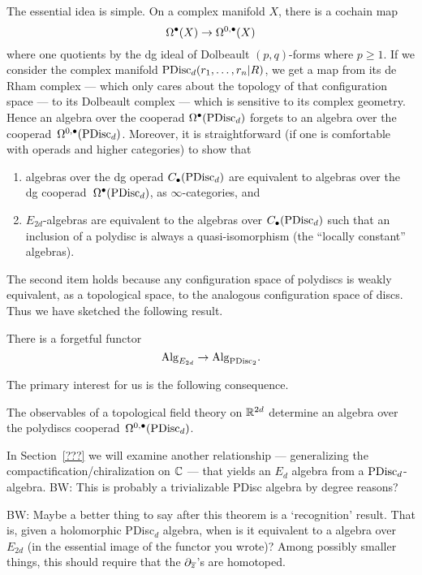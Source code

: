 \documentclass[11pt]{amsart}
\def\del{\partial}
\def\brian#1{{\textcolor{blue!75!red}{BW: {#1}}}}
\begin{document}
The essential idea is simple.
On a complex manifold $X$, there is a cochain map
\[
\Omega^\bullet(X) \to \Omega^{0,\bullet}(X)
\]
where one quotients by the dg ideal of Dolbeault $(p,q)$-forms where $p \geq 1$.
If we consider the complex manifold ${\rm PDisc}_d(r_1,\ldots,r_n|R)$, 
we get a map from its de Rham complex --- which only cares about the topology of that configuration space --- to its Dolbeault complex --- which is sensitive to its complex geometry.
Hence an algebra over the cooperad $\Omega^\bullet({\rm PDisc}_d)$ forgets to an algebra over the cooperad~$\Omega^{0,\bullet}({\rm PDisc}_d)$.
Moreover, it is straightforward (if one is comfortable with operads and higher categories) to show that 
\begin{enumerate}
\item algebras over the dg operad $C_\bullet({\rm PDisc}_d)$ are equivalent to algebras over the dg cooperad~$\Omega^\bullet({\rm PDisc}_d)$, as $\infty$-categories, and
\item $E_{2d}$-algebras are equivalent to the algebras over $C_\bullet({\rm PDisc}_d)$ such that an inclusion of a polydisc is always a quasi-isomorphism (the ``locally constant'' algebras).
\end{enumerate}
The second item holds because any configuration space of polydiscs is weakly equivalent, as a topological space, to the analogous configuration space of discs.
Thus we have sketched the following result.

\begin{thm}
There is a forgetful functor
\[
{\rm Alg}_{E_{2d}} \to  {\rm Alg}_{{\rm PDisc}_2}.
\]
\end{thm}

The primary interest for us is the following consequence.

\begin{cor}
The observables of a topological field theory on $\mathbb R^{2d}$ determine an algebra over the polydiscs cooperad~$\Omega^{0,\bullet}({\rm PDisc}_d)$.
\end{cor}

In Section~\ref{???} we will examine another relationship --- generalizing the compactification/chiralization on $\mathbb C$ --- that yields an $E_d$ algebra from a ${\rm PDisc}_d$-algebra.
\brian{This is probably a trivializable PDisc algebra by degree reasons?}

\brian{Maybe a better thing to say after this theorem is a `recognition' result.
That is, given a holomorphic PDisc$_{d}$ algebra, when is it equivalent to a algebra over $E_{2d}$ (in the essential image of the functor you wrote)?
Among possibly smaller things, this should require that the $\del_{\zbar}$'s are homotoped.}
\end{document}
